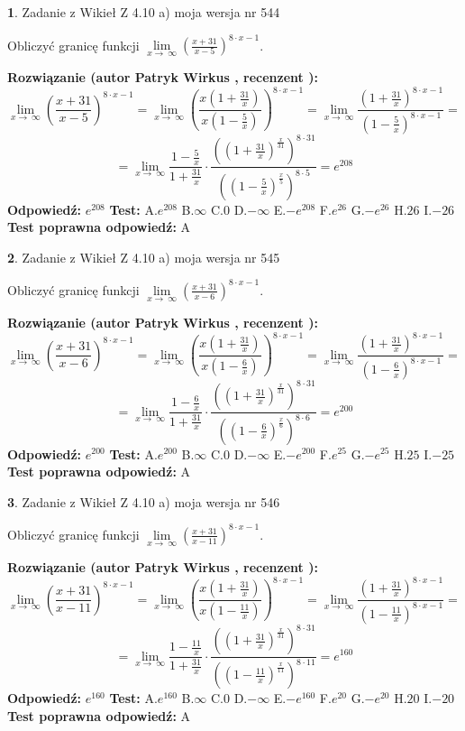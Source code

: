 \documentclass[12pt, a4paper]{article}
\theoremstyle{definition} %
\newtheorem{zad}{}
\newcommand{\zadStart}[1]{\begin{zad}#1\newline}
\newcommand{\zadStop}{\end{zad}}
\newcommand{\rozwStart}[2]{\noindent \textbf{Rozwiązanie (autor #1 , recenzent #2): }\newline}
\newcommand{\rozwStop}{\newline}
\newcommand{\odpStart}{\noindent \textbf{Odpowiedź:}\newline}
\newcommand{\odpStop}{\newline}
\newcommand{\testStart}{\noindent \textbf{Test:}\newline}
\newcommand{\testStop}{\newline}
\newcommand{\kluczStart}{\noindent \textbf{Test poprawna odpowiedź:}\newline}
\newcommand{\kluczStop}{\newline}
\begin{document}
\zadStart{Zadanie z Wikieł Z 4.10 a) moja wersja nr 544}

Obliczyć granicę funkcji  $\lim\limits_{x\to\ \infty}(\frac{x+31}{x-5})^{8\cdot x-1}$.
\zadStop
\rozwStart{Patryk Wirkus}{}
$$\lim\limits_{x\to\ \infty}(\frac{x+31}{x-5})^{8\cdot x-1} = \lim\limits_{x\to\ \infty}(\frac{x(1+\frac{31}{x})}{x(1-\frac{5}{x})})^{8\cdot x-1}=\lim\limits_{x\to\ \infty}\frac{(1+\frac{31}{x})^{8\cdot x-1}}{(1-\frac{5}{x})^{8\cdot x-1}}=$$
$$=\lim\limits_{x\to\ \infty}\frac{1-\frac{5}{x}}{1+\frac{31}{x}}\cdot\frac{((1+\frac{31}{x})^{\frac{x}{31}})^{8\cdot31}}{((1-\frac{5}{x})^{\frac{x}{5}})^{8\cdot5}}=e^{208}$$
\rozwStop
\odpStart
$e^{208}$
\odpStop
\testStart
A.$e^{208}$ B.$\infty$ C.$0$ D.$-\infty$ E.$-e^{208}$
F.$e^{26}$ G.$-e^{26}$
H.$26$
I.$-26$
\testStop
\kluczStart
A
\kluczStop



\zadStart{Zadanie z Wikieł Z 4.10 a) moja wersja nr 545}

Obliczyć granicę funkcji  $\lim\limits_{x\to\ \infty}(\frac{x+31}{x-6})^{8\cdot x-1}$.
\zadStop
\rozwStart{Patryk Wirkus}{}
$$\lim\limits_{x\to\ \infty}(\frac{x+31}{x-6})^{8\cdot x-1} = \lim\limits_{x\to\ \infty}(\frac{x(1+\frac{31}{x})}{x(1-\frac{6}{x})})^{8\cdot x-1}=\lim\limits_{x\to\ \infty}\frac{(1+\frac{31}{x})^{8\cdot x-1}}{(1-\frac{6}{x})^{8\cdot x-1}}=$$
$$=\lim\limits_{x\to\ \infty}\frac{1-\frac{6}{x}}{1+\frac{31}{x}}\cdot\frac{((1+\frac{31}{x})^{\frac{x}{31}})^{8\cdot31}}{((1-\frac{6}{x})^{\frac{x}{6}})^{8\cdot6}}=e^{200}$$
\rozwStop
\odpStart
$e^{200}$
\odpStop
\testStart
A.$e^{200}$ B.$\infty$ C.$0$ D.$-\infty$ E.$-e^{200}$
F.$e^{25}$ G.$-e^{25}$
H.$25$
I.$-25$
\testStop
\kluczStart
A
\kluczStop



\zadStart{Zadanie z Wikieł Z 4.10 a) moja wersja nr 546}

Obliczyć granicę funkcji  $\lim\limits_{x\to\ \infty}(\frac{x+31}{x-11})^{8\cdot x-1}$.
\zadStop
\rozwStart{Patryk Wirkus}{}
$$\lim\limits_{x\to\ \infty}(\frac{x+31}{x-11})^{8\cdot x-1} = \lim\limits_{x\to\ \infty}(\frac{x(1+\frac{31}{x})}{x(1-\frac{11}{x})})^{8\cdot x-1}=\lim\limits_{x\to\ \infty}\frac{(1+\frac{31}{x})^{8\cdot x-1}}{(1-\frac{11}{x})^{8\cdot x-1}}=$$
$$=\lim\limits_{x\to\ \infty}\frac{1-\frac{11}{x}}{1+\frac{31}{x}}\cdot\frac{((1+\frac{31}{x})^{\frac{x}{31}})^{8\cdot31}}{((1-\frac{11}{x})^{\frac{x}{11}})^{8\cdot11}}=e^{160}$$
\rozwStop
\odpStart
$e^{160}$
\odpStop
\testStart
A.$e^{160}$ B.$\infty$ C.$0$ D.$-\infty$ E.$-e^{160}$
F.$e^{20}$ G.$-e^{20}$
H.$20$
I.$-20$
\testStop
\kluczStart
A
\kluczStop
\end{document}
